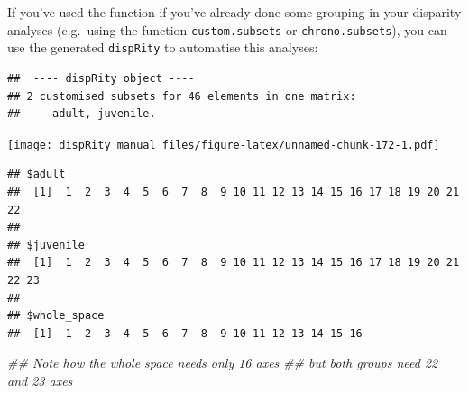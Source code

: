 \documentclass[
]{book}
\newenvironment{Shaded}{\begin{snugshade}}{\end{snugshade}}
\newcommand{\CommentTok}[1]{\textcolor[rgb]{0.56,0.35,0.01}{\textit{#1}}}
\newcommand{\KeywordTok}[1]{\textcolor[rgb]{0.13,0.29,0.53}{\textbf{#1}}}
\newcommand{\NormalTok}[1]{#1}
\newcommand{\OperatorTok}[1]{\textcolor[rgb]{0.81,0.36,0.00}{\textbf{#1}}}
\newcommand{\StringTok}[1]{\textcolor[rgb]{0.31,0.60,0.02}{#1}}
\begin{document}
If you've used the function if you've already done some grouping in your disparity analyses (e.g.~using the function \texttt{custom.subsets} or \texttt{chrono.subsets}), you can use the generated \texttt{dispRity} to automatise this analyses:

\begin{Shaded}
\end{Shaded}

\begin{verbatim}
##  ---- dispRity object ---- 
## 2 customised subsets for 46 elements in one matrix:
##     adult, juvenile.
\end{verbatim}

\begin{Shaded}
\end{Shaded}

\texttt{[image: dispRity\_manual\_files/figure-latex/unnamed-chunk-172-1.pdf]}

\begin{Shaded}
\end{Shaded}

\begin{verbatim}
## $adult
##  [1]  1  2  3  4  5  6  7  8  9 10 11 12 13 14 15 16 17 18 19 20 21 22
## 
## $juvenile
##  [1]  1  2  3  4  5  6  7  8  9 10 11 12 13 14 15 16 17 18 19 20 21 22 23
## 
## $whole_space
##  [1]  1  2  3  4  5  6  7  8  9 10 11 12 13 14 15 16
\end{verbatim}

\begin{Shaded}
\begin{Highlighting}[]
\CommentTok{\#\# Note how the whole space needs only 16 axes}
\CommentTok{\#\# but both groups need 22 and 23 axes}
\end{Highlighting}
\end{Shaded}
\end{document}
